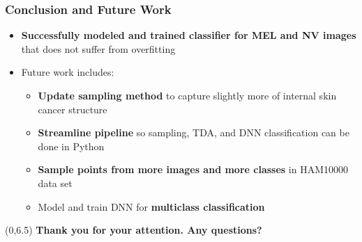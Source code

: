 \documentclass[aspectratio=169]{beamer}
\begin{document}
\begin{frame}
\frametitle{Conclusion and Future Work} %
\vspace*{-4mm}
\begin{itemize}\justifying
\item {\bfseries \textcolor{UF_dark_blue}{Successfully modeled and trained classifier for MEL and NV images}} that does not suffer from overfitting
\item Future work includes:
	\begin{itemize}\justifying
	\item {\bfseries \textcolor{UF_dark_blue}{Update sampling method}} to capture slightly more of internal skin cancer structure
	\item {\bfseries \textcolor{UF_dark_blue}{Streamline pipeline}} so sampling, TDA, and DNN classification can be done in Python
	\item {\bfseries \textcolor{UF_dark_blue}{Sample points from more images and more classes}} in HAM10000 data set
	\item Model and train DNN for {\bfseries \textcolor{UF_dark_blue}{multiclass classification}}
	\end{itemize}
\end{itemize}
\end{frame}


\begin{frame}
  \begin{textblock}{16}(0,6.5)
    \centering
    {\LARGE \color{white}\bf Thank you for your attention. Any questions?}
  \end{textblock}
\end{frame}
\end{document}
